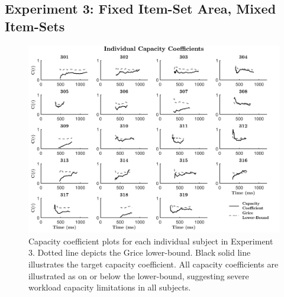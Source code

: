 \subsection{Experiment 3: Fixed Item-Set Area, Mixed Item-Sets}
\begin{figure}[htb]
\begin{center}
\includegraphics[width=\linewidth]{Figures/Appendix/FIG18JPG.jpg}
\caption{Capacity coefficient plots for each individual subject in Experiment 3. Dotted line depicts the Grice lower-bound. Black solid line illustrates the target capacity coefficient. All capacity coefficients are illustrated as on or below the lower-bound, suggesting severe workload capacity limitations in all subjects.}
\label{fig:Indiv_Cap_Ex3}
\end{center}
\end{figure}

\newpage
